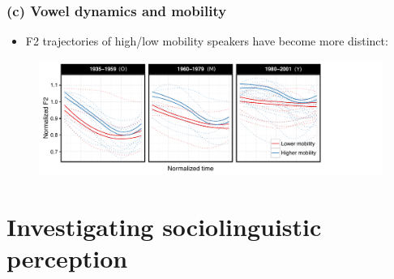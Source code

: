 \documentclass[a0,portrait]{a0poster}
\begin{document}
\begin{multicols*}{3}
\subsubsection*{(c) Vowel dynamics and mobility}
\begin{itemize}
\item{F2 trajectories of high/low mobility speakers have become more distinct:}
\end{itemize}
\vspace*{-1cm}
\begin{figure}[H]
\hspace*{-1.5cm}
\includegraphics[scale=1.4]{o_mobility_curve.pdf}
\end{figure}

\columnbreak
\section*{Investigating sociolinguistic perception}


\end{multicols*}
\end{document}
